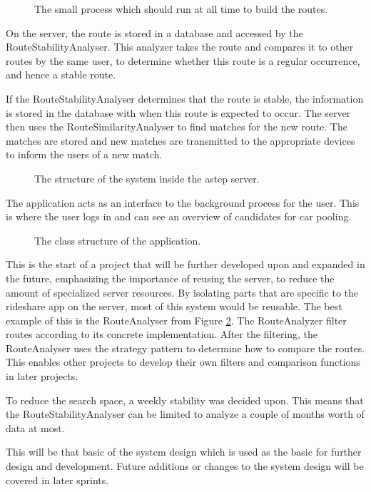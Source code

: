 \begin{figure}[h]
	\centering
	
	\caption{The small process which should run at all time to build the routes.}
	\label{fig:classDiagramSprint1Observer}
\end{figure}


On the server, the route is stored in a database and accessed by the RouteStabilityAnalyser.
This analyzer takes the route and compares it to other routes by the same user, to determine whether this route is a regular occurrence, and hence a stable route.

If the RouteStabilityAnalyser determines that the route is stable, the information is stored in the database with when this route is expected to occur.
The server then uses the RouteSimilarityAnalyser to find matches for the new route.
The matches are stored and new matches are transmitted to the appropriate devices to inform the users of a new match.

\begin{figure}[ht!]
	\centering
	
	\caption{The structure of the system inside the \gls{astep} server.}
	\label{fig:classDiagramSprint1Server}
\end{figure}

The application acts as an interface to the background process for the user.
This is where the user logs in and can see an overview of candidates for car pooling.

\begin{figure}[ht!]
	\centering
	
	\caption{The class structure of the application.}
	\label{fig:classDiagramSprint1Application}
\end{figure}

This is the start of a project that will be further developed upon and expanded in the future, emphasizing the importance of reusing the server, to reduce the amount of specialized server resources.
By isolating parts that are specific to the rideshare app on the server, most of this system would be reusable.
The best example of this is the RouteAnalyser from Figure \ref{fig:classDiagramSprint1Server}.
The RouteAnalyzer filter routes according to its concrete implementation.
After the filtering, the RouteAnalyser uses the strategy pattern to determine how to compare the routes.
This enables other projects to develop their own filters and comparison functions in later projects.

To reduce the search space, a weekly stability was decided upon.
This means that the RouteStabilityAnalyser can be limited to analyze a couple of months worth of data at most.

This will be that basic of the system design which is used as the basic for further design and development.
Future additions or changes to the system design will be covered in later sprints. 
